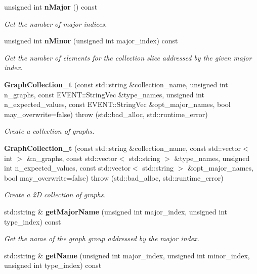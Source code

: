 \begin{DoxyCompactItemize}
\item 
unsigned int {\bf nMajor} () const 
\begin{DoxyCompactList}\small\item\em Get the number of major indices. \item\end{DoxyCompactList}\item 
unsigned int {\bf nMinor} (unsigned int major\_\-index) const 
\begin{DoxyCompactList}\small\item\em Get the number of elements for the collection slice addressed by the given major index. \item\end{DoxyCompactList}\item 
{\bf GraphCollection\_\-t} (const std::string \&collection\_\-name, unsigned int n\_\-graphs, const EVENT::StringVec \&type\_\-names, unsigned int n\_\-expected\_\-values, const EVENT::StringVec \&opt\_\-major\_\-names, bool may\_\-overwrite=false)  throw (std::bad\_\-alloc, std::runtime\_\-error)
\begin{DoxyCompactList}\small\item\em Create a collection of graphs. \item\end{DoxyCompactList}\item 
{\bf GraphCollection\_\-t} (const std::string \&collection\_\-name, const std::vector$<$ int $>$ \&n\_\-graphs, const std::vector$<$ std::string $>$ \&type\_\-names, unsigned int n\_\-expected\_\-values, const std::vector$<$ std::string $>$ \&opt\_\-major\_\-names, bool may\_\-overwrite=false)  throw (std::bad\_\-alloc, std::runtime\_\-error)
\begin{DoxyCompactList}\small\item\em Create a 2D collection of graphs. \item\end{DoxyCompactList}\item 
std::string \& {\bf getMajorName} (unsigned int major\_\-index, unsigned int type\_\-index) const 
\begin{DoxyCompactList}\small\item\em Get the name of the graph group addressed by the major index. \item\end{DoxyCompactList}\item 
std::string \& {\bf getName} (unsigned int major\_\-index, unsigned int minor\_\-index, unsigned int type\_\-index) const 

\end{DoxyCompactItemize}
